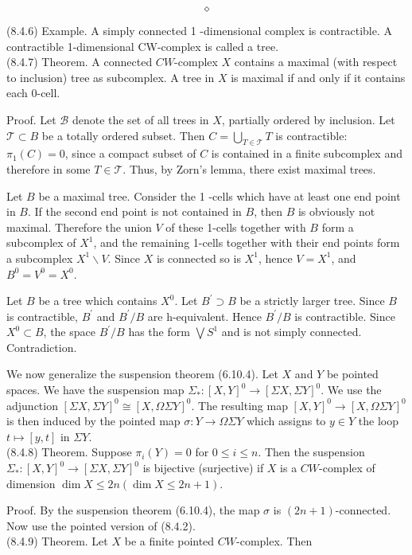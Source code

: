 \documentclass[10pt, letterpaper]{article}
\begin{document}
$$
\diamond
$$

(8.4.6) Example. A simply connected 1 -dimensional complex is contractible. A contractible 1-dimensional CW-complex is called a tree.\\
(8.4.7) Theorem. A connected $C W$-complex $X$ contains a maximal (with respect to inclusion) tree as subcomplex. A tree in $X$ is maximal if and only if it contains each 0-cell.

Proof. Let $\mathscr{B}$ denote the set of all trees in $X$, partially ordered by inclusion. Let $\mathcal{T} \subset B$ be a totally ordered subset. Then $C=\bigcup_{T \in \mathcal{T}} T$ is contractible: $\pi_{1}(C)=0$, since a compact subset of $C$ is contained in a finite subcomplex and therefore in some $T \in \mathcal{T}$. Thus, by Zorn's lemma, there exist maximal trees.

Let $B$ be a maximal tree. Consider the 1 -cells which have at least one end point in $B$. If the second end point is not contained in $B$, then $B$ is obviously not maximal. Therefore the union $V$ of these 1-cells together with $B$ form a subcomplex of $X^{1}$, and the remaining 1-cells together with their end points form a subcomplex $X^{1} \backslash V$. Since $X$ is connected so is $X^{1}$, hence $V=X^{1}$, and $B^{0}=V^{0}=X^{0}$.

Let $B$ be a tree which contains $X^{0}$. Let $B^{\prime} \supset B$ be a strictly larger tree. Since $B$ is contractible, $B^{\prime}$ and $B^{\prime} / B$ are h-equivalent. Hence $B^{\prime} / B$ is contractible. Since $X^{0} \subset B$, the space $B^{\prime} / B$ has the form $\bigvee S^{1}$ and is not simply connected. Contradiction.

We now generalize the suspension theorem (6.10.4). Let $X$ and $Y$ be pointed spaces. We have the suspension map $\Sigma_{*}:[X, Y]^{0} \rightarrow[\Sigma X, \Sigma Y]^{0}$. We use the adjunction $[\Sigma X, \Sigma Y]^{0} \cong[X, \Omega \Sigma Y]^{0}$. The resulting map $[X, Y]^{0} \rightarrow[X, \Omega \Sigma Y]^{0}$ is then induced by the pointed map $\sigma: Y \rightarrow \Omega \Sigma Y$ which assigns to $y \in Y$ the loop $t \mapsto[y, t]$ in $\Sigma Y$.\\
(8.4.8) Theorem. Suppose $\pi_{i}(Y)=0$ for $0 \leq i \leq n$. Then the suspension $\Sigma_{*}:[X, Y]^{0} \rightarrow[\Sigma X, \Sigma Y]^{0}$ is bijective (surjective) if $X$ is a $C W$-complex of dimension $\operatorname{dim} X \leq 2 n(\operatorname{dim} X \leq 2 n+1)$.

Proof. By the suspension theorem (6.10.4), the map $\sigma$ is $(2 n+1)$-connected. Now use the pointed version of (8.4.2).\\
(8.4.9) Theorem. Let $X$ be a finite pointed $C W$-complex. Then
\end{document}
